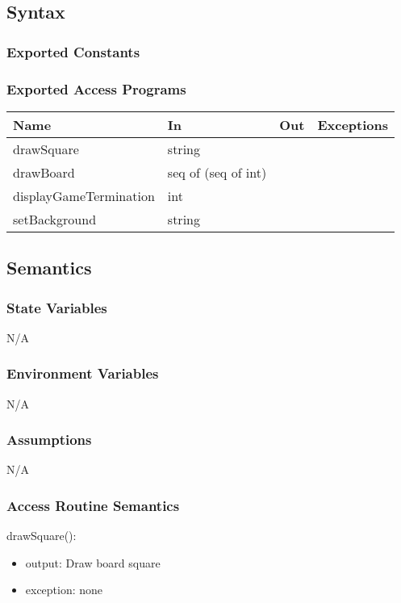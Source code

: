 \documentclass[12pt, titlepage]{article}
\begin{document}
    \subsection{Syntax}
    \subsubsection{Exported Constants}

    \subsubsection{Exported Access Programs}
        \begin{center}
        \begin{tabular}{p{5cm} p{3.5cm} p{3cm} p{2.5cm}}
        \hline
        \textbf{Name} & \textbf{In} & \textbf{Out} & \textbf{Exceptions} \\
        \hline
        drawSquare & string & & \\
        \hline
        drawBoard & seq of (seq of int) & & \\
        \hline
        displayGameTermination & int & & \\
        \hline
        setBackground & string & & \\
        \hline
        \end{tabular}
        \end{center}

    \subsection{Semantics}
    \subsubsection{State Variables}
    N/A

    \subsubsection{Environment Variables}
    N/A

    \subsubsection{Assumptions}
    N/A

    \subsubsection{Access Routine Semantics}
        \noindent drawSquare():
        \begin{itemize}
            \item output: Draw board square
            \item exception: none
        \end{itemize}
\end{document}
